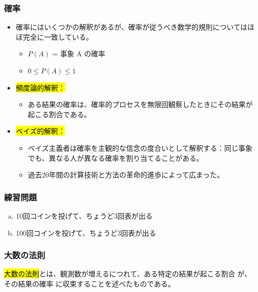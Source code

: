\begin{frame}
\frametitle{確率}

\begin{itemize}

\item 確率にはいくつかの解釈があるが、確率が従うべき数学的規則についてはほぼ完全に一致している。
\begin{itemize}
\item $P(A)$ = 事象 A の確率
\item $0 \le P(A) \le 1$
\end{itemize}

\item \hl{頻度論的解釈：}
\begin{itemize}
\item ある結果の確率は、確率的プロセスを無限回観察したときにその結果が起こる割合である。
\end{itemize}

\item \hl{ベイズ的解釈：}
\begin{itemize}
\item ベイズ主義者は確率を主観的な信念の度合いとして解釈する：同じ事象でも、異なる人が異なる確率を割り当てることがある。
\item 過去20年間の計算技術と方法の革命的進歩によって広まった。
\end{itemize}

\end{itemize}

\end{frame}


\begin{frame}[shrink=25]
\frametitle{練習問題}


\begin{enumerate}[(a)]
\item 10回コインを投げて、ちょうど3回表が出る
\item 100回コインを投げて、ちょうど3回表が出る
\end{enumerate}

\end{frame}


\begin{frame}
\frametitle{大数の法則}

\hl{大数の法則}とは、観測数が増えるにつれて、ある特定の結果が起こる割合  が、その結果の確率  に収束することを述べたものである。

\end{frame}

